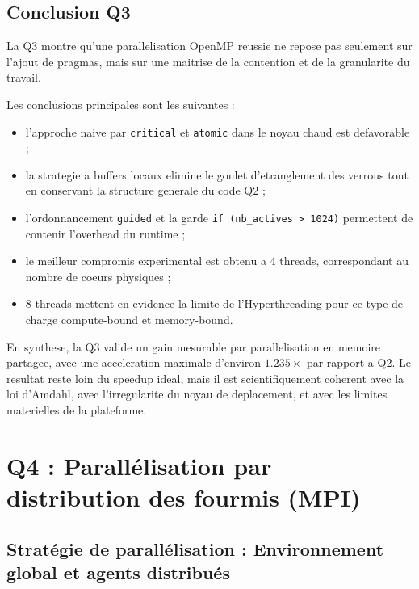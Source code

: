 \documentclass[11pt,a4paper]{article}
\begin{document}
\subsection{Conclusion Q3}

La Q3 montre qu'une parallelisation OpenMP reussie ne repose pas seulement sur l'ajout de pragmas, mais sur une maitrise de la contention et de la granularite du travail.

Les conclusions principales sont les suivantes :

\begin{itemize}[leftmargin=1.2em]
  \item l'approche naive par \texttt{critical} et \texttt{atomic} dans le noyau chaud est defavorable ;
  \item la strategie a buffers locaux elimine le goulet d'etranglement des verrous tout en conservant la structure generale du code Q2 ;
  \item l'ordonnancement \texttt{guided} et la garde \texttt{if (nb\_actives > 1024)} permettent de contenir l'overhead du runtime ;
  \item le meilleur compromis experimental est obtenu a 4 threads, correspondant au nombre de coeurs physiques ;
  \item 8 threads mettent en evidence la limite de l'Hyperthreading pour ce type de charge compute-bound et memory-bound.
\end{itemize}

En synthese, la Q3 valide un gain mesurable par parallelisation en memoire partagee, avec une acceleration maximale d'environ \(1.235\times\) par rapport a Q2. Le resultat reste loin du speedup ideal, mais il est scientifiquement coherent avec la loi d'Amdahl, avec l'irregularite du noyau de deplacement, et avec les limites materielles de la plateforme.


\section{Q4 : Parallélisation par distribution des fourmis (MPI)}

\subsection{Stratégie de parallélisation : Environnement global et agents distribués}
\end{document}
